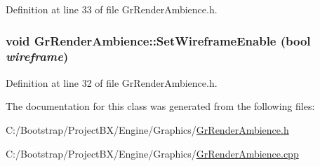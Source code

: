 Definition at line 33 of file GrRenderAmbience.h.\hypertarget{class_gr_render_ambience_933fb2f85e7fe005bc9e7fd1e3c75288}{
\subsubsection[{SetWireframeEnable}]{\setlength{\rightskip}{0pt plus 5cm}void GrRenderAmbience::SetWireframeEnable (bool {\em wireframe})}}
\label{class_gr_render_ambience_933fb2f85e7fe005bc9e7fd1e3c75288}




Definition at line 32 of file GrRenderAmbience.h.

The documentation for this class was generated from the following files:\begin{CompactItemize}
\item 
C:/Bootstrap/ProjectBX/Engine/Graphics/\hyperlink{_gr_render_ambience_8h}{GrRenderAmbience.h}\item 
C:/Bootstrap/ProjectBX/Engine/Graphics/\hyperlink{_gr_render_ambience_8cpp}{GrRenderAmbience.cpp}\end{CompactItemize}
